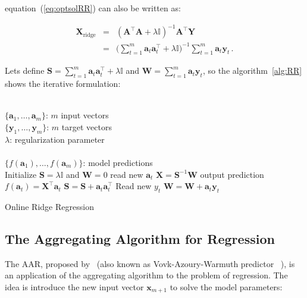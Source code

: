 \noindent equation~(\ref{eq:optsolRR}) can also be written as: 

\begin{eqnarray*}
\label{eq:RReapand}
\mathbf{\mathbf{X}}_{\text{ridge}}&=&(\mathbf{A}^\top \mathbf{A}+ \lambda
\mathbb{I})^{-1}\mathbf{A}^\top \mathbf{Y} \\
&=& \displaystyle \big (\sum_{t=1}^m
\mathbf{a}_t \mathbf{a}_t  ^\top + \lambda \mathbb{I}\big )^{-1}
\sum_{t=1}^m \mathbf{a}_t \mathbf{y}_t \, .
\end{eqnarray*}

Lets define $\displaystyle\mathbf{S}= \sum_{t=1}^m \mathbf{a}_t
\mathbf{a}_t  ^\top + \lambda \mathbb{I} $ and $\mathbf{W}=
\displaystyle\sum_{t=1}^m \mathbf{a}_t \mathbf{y}_t$, so the
algorithm~\ref{alg:RR} shows the iterative formulation:

\begin{algorithm}[H]
\begin{algorithmic}[1]
\REQUIRE $\,$ \\
$\{\mathbf{a}_1,\dots,\mathbf{a}_{m} \}$: $m$ input vectors \\
$\{\mathbf{y}_1,\dots,\mathbf{y}_{m} \}$: $m$ target vectors \\
$\lambda$: regularization parameter \\
\ENSURE  $\,$ \\
$\{f(\mathbf{a}_1),\dots,f(\mathbf{a}_{m}) \}$: model predictions \\
\STATE Initialize $\mathbf{S}=\lambda \mathbb{I}$
and $\mathbf{W}=0$
	\STATE read new $\mathbf{a}_t$
	\STATE $\mathbf{X}=\mathbf{S}^{-1}\mathbf{W}$
	\STATE output prediction $f(\mathbf{a}_t) = \mathbf{X}^\top \mathbf{a}_t$
   	\STATE $\mathbf{S} = \mathbf{S} + \mathbf{a}_t \mathbf{a}_t^\top$
   	\STATE Read new $y_t$
    	\STATE $\mathbf{W} = \mathbf{W} + \mathbf{a}_t \mathbf{y}_t$
\ENDFOR
\end{algorithmic}
\caption{Online Ridge Regression}
\label{alg:RR}
\end{algorithm}



\subsection{The Aggregating Algorithm for Regression}

The AAR, proposed by~\cite{vovk2001} (also known as Vovk-Azoury-Warmuth predictor ~\cite{azoury2001}), is an application of the aggregating
algorithm to the problem of regression. The idea is introduce the new input
vector $\mathbf{x}_{m+1}$ to solve the model parameters: 

